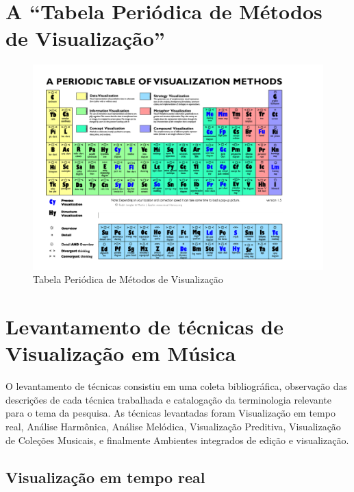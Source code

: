 \documentclass{sciposter}
\begin{document}
\begin{multicols}{2}

\section{A ``Tabela Periódica de Métodos de Visualização''}

\begin{center}

\begin{figure}[!h]
  \centering
  \includegraphics{./figs/tabela-periodica.pdf}
  \caption{Tabela Periódica de Métodos de Visualização \cite{Lengler2007}}
  \label{fig:label-figura}
\end{figure}

\end{center}

\section{Levantamento de técnicas de Visualização em Música}

O levantamento de técnicas consistiu em uma coleta bibliográfica, observação
das descrições de cada técnica trabalhada e catalogação da terminologia
relevante para o tema da pesquisa. As técnicas levantadas foram Visualização em
tempo real, Análise Harmônica, Análise Melódica, Visualização Preditiva,
Visualização de Coleções Musicais, e finalmente Ambientes integrados de edição
e visualização.

\subsection{Visualização em tempo real}


\end{multicols}
\end{document}
